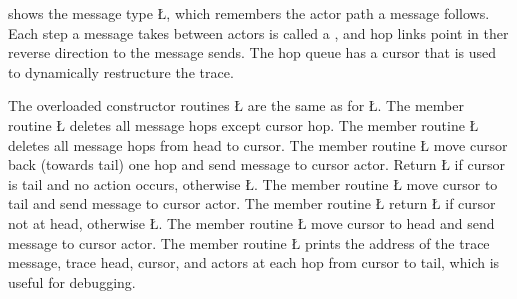 \documentclass[openright,twoside]{report}
\begin{document}
 shows the message type \LGinlinetrue\LGbegin\lgrinde\L{}\endlgrinde\LGend{}, which remembers the actor path a message follows.
Each step a message takes between actors is called a , and hop links point in ther reverse direction to the message sends.
The hop queue has a cursor that is used to dynamically restructure the trace.
\begin{center}

\end{center}
The overloaded constructor routines \LGinlinetrue\LGbegin\lgrinde\L{}\endlgrinde\LGend{} are the same as for \LGinlinetrue\LGbegin\lgrinde\L{}\endlgrinde\LGend{}.
The member routine \LGinlinetrue\LGbegin\lgrinde\L{}\endlgrinde\LGend{} deletes all message hops except cursor hop.
The member routine \LGinlinetrue\LGbegin\lgrinde\L{}\endlgrinde\LGend{} deletes all message hops from head to cursor.
The member routine \LGinlinetrue\LGbegin\lgrinde\L{}\endlgrinde\LGend{} move cursor back (towards tail) one hop and send message to cursor actor.
Return \LGinlinetrue\LGbegin\lgrinde\L{}\endlgrinde\LGend{} if cursor is tail and no action occurs, otherwise \LGinlinetrue\LGbegin\lgrinde\L{}\endlgrinde\LGend{}.
The member routine \LGinlinetrue\LGbegin\lgrinde\L{}\endlgrinde\LGend{} move cursor to tail and send message to cursor actor.
The member routine \LGinlinetrue\LGbegin\lgrinde\L{}\endlgrinde\LGend{} return \LGinlinetrue\LGbegin\lgrinde\L{}\endlgrinde\LGend{} if cursor not at head, otherwise \LGinlinetrue\LGbegin\lgrinde\L{}\endlgrinde\LGend{}.
The member routine \LGinlinetrue\LGbegin\lgrinde\L{}\endlgrinde\LGend{} move cursor to head and send message to cursor actor.
The member routine \LGinlinetrue\LGbegin\lgrinde\L{}\endlgrinde\LGend{} prints the address of the trace message, trace head, cursor, and actors at each hop from cursor to tail, which is useful for debugging.
\end{document}
